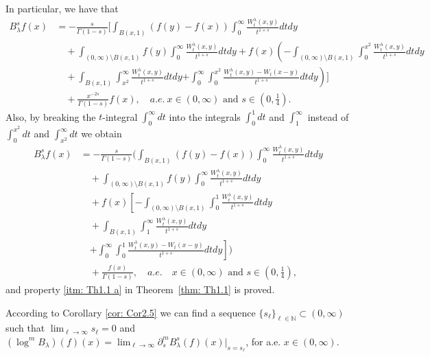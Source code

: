 \documentclass[a4paper,10pt, reqno]{amsart}
\theoremstyle{definition}
\theoremstyle{remark}
\numberwithin{equation}{section}
\begin{document}
In particular, we have that 
\begin{align*}
    B_\lambda^sf(x)&=-\frac{s}{\Gamma(1-s)}\Bigg[\int_{B(x,1)}(f(y)-f(x))\int_0^\infty \frac{W_t^\lambda (x,y)}{t^{1+s}}dtdy\\
    &\quad +\int_{(0,\infty)\setminus B(x,1)}f(y)\int_0^\infty \frac{W_t^\lambda (x,y)}{t^{1+s}}dtdy +f(x)\left(-\int_{(0,\infty)\setminus B(x,1)}\int_0^{x^2}\frac{W_t^\lambda (x,y)}{t^{1+s}}dtdy\right. \\
    &\quad +\int_{B(x,1)}\int_{x^2}^\infty \frac{W_t^\lambda (x,y)}{t^{1+s}}dtdy\left.+\int_0^\infty \int_0^{x^2}\frac{W_t^\lambda (x,y)-W_t(x-y)}{t^{1+s}}dtdy\right)\Bigg]\\
    &\quad +\frac{x^{-2s}}{\Gamma(1-s)}f(x),\quad a.e.\ x\in (0,\infty)\mbox{ and }s\in \left(0,\tfrac{1}{4}\right).
\end{align*}
Also, by breaking the $t$-integral $\int_0^\infty dt$ into the integrals $\int_0^1dt$ and $\int_1^\infty$ instead of $\int_0^{x^2}dt$ and $\int_{x^2}^\infty dt$ we obtain
\begin{align*}
    B_\lambda^sf(x)&=-\frac{s}{\Gamma(1-s)}\Bigg(\int_{B(x,1)}(f(y)-f(x))\int_0^\infty \frac{W_t^\lambda (x,y)}{t^{1+s}}dtdy\\
     &\quad +\int_{(0,\infty)\setminus B(x,1)}f(y)\int_0^\infty \frac{W_t^\lambda (x,y)}{t^{1+s}}dtdy\\
    &\quad +f(x)\left[-\int_{(0,\infty)\setminus B(x,1)}\int_0^{1}\frac{W_t^\lambda (x,y)}{t^{1+s}}dtdy\right.\\
    &\quad +\int_{B(x,1)}\int_{1}^\infty \frac{W_t^\lambda (x,y)}{t^{1+s}}dtdy\\
    &\quad \left.+\int_0^\infty \int_0^{1}\frac{W_t^\lambda (x,y)-W_t(x-y)}{t^{1+s}}dtdy\right]\Bigg)\\
    &\quad + \frac{f(x)}{\Gamma(1-s)},\quad a.e.\quad x\in (0,\infty)\mbox{ and }s\in \left(0,\tfrac{1}{4}\right),
\end{align*}
and property \ref{itm: Th1.1 a} in Theorem~\ref{thm: Th1.1} is proved.

According to Corollary \ref{cor: Cor2.5} we can find a sequence $\{s_\ell\}_{\ell\in \mathbb{N}}\subset (0,\infty)$ such that $\lim_{\ell\to \infty}s_\ell=0$ and $(\log^m B_\lambda)(f)(x)=\lim_{\ell\to\infty}\partial_{s}^m B_\lambda^s(f)(x)\Big|_{s=s_\ell}$, for a.e. $x\in (0,\infty).$
\end{document}
